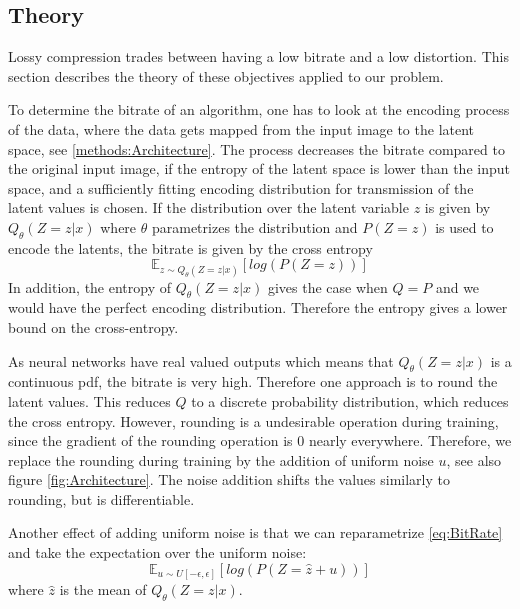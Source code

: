 \subsection{Theory}
    Lossy compression trades between having a low bitrate and a low distortion.
    This section describes the theory of these objectives applied to our
    problem.\newline

    To determine the bitrate of an algorithm, one has to look at the encoding
    process of the data, where the data gets mapped from the input image to the
    latent space, see \ref{methods:Architecture}. The process decreases the
    bitrate compared to the original input image, if the entropy of the latent
    space is lower than the input space, and a sufficiently fitting encoding
    distribution for transmission of the latent values is chosen. If the
    distribution over the latent variable $z$ is given by $Q_\theta(Z=z \vert x)$ where
    $\theta$ parametrizes the distribution and $P(Z=z)$ is used to encode the
    latents, the bitrate is given by the cross entropy
    \begin{equation}\label{eq:BitRate}
        \mathbb{E}_{z \sim Q_\theta(Z=z \vert x)}[log(P(Z=z))]
    \end{equation}
    In addition, the entropy of $Q_\theta(Z=z \vert x)$ gives the case when
    $Q=P$ and we would have the perfect encoding distribution. Therefore the
    entropy gives a lower bound on the cross-entropy.
    
    As neural networks have real valued outputs which means that $Q_\theta(Z=z
    \vert x)$ is a continuous pdf, the bitrate is very high. Therefore one
    approach is to round the latent values. This reduces $Q$ to a discrete
    probability distribution, which reduces the cross entropy. However, rounding
    is a undesirable operation during training, since the gradient of the
    rounding operation is 0 nearly everywhere. Therefore, we replace the
    rounding during training by the addition of uniform noise $u$, see also
    figure \ref{fig:Architecture}. The noise addition shifts the values
    similarly to rounding, but is differentiable.
    
    Another effect of adding uniform noise is that we can reparametrize
    \ref{eq:BitRate} and take the expectation over the uniform noise:
    \begin{equation}
        \mathbb{E}_{u \sim U[-\epsilon, \epsilon]}[log(P(Z=\hat{z} + u))]
    \end{equation}
    where $\hat{z}$ is the mean of $Q_\theta(Z=z \vert x)$. \newline

